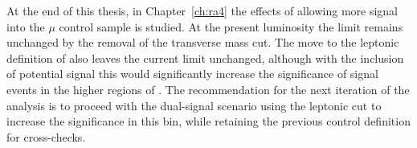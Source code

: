 At the end of this thesis, in Chapter~\ref{ch:ra4} the effects of allowing more signal into the $\mu$ control sample is studied. At the present luminosity the limit remains unchanged by the removal of the transverse mass cut. The move to the leptonic definition of \alt also leaves the current limit unchanged, although with the inclusion of potential signal this would significantly increase the significance of signal events in the higher regions of \HT.  The recommendation for the next iteration of the analysis is to proceed with the dual-signal scenario using the leptonic \alt cut to increase the significance in this bin, while retaining the previous control definition for cross-checks. 

